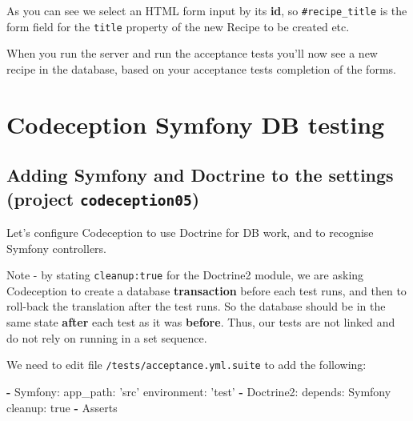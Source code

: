 \documentclass[a4paperpaper,openright]{book}
\newenvironment{Shaded}{}{}
\newcommand{\AttributeTok}[1]{\textcolor[rgb]{0.49,0.56,0.16}{#1}}
\newcommand{\CharTok}[1]{\textcolor[rgb]{0.25,0.44,0.63}{#1}}
\newcommand{\FunctionTok}[1]{\textcolor[rgb]{0.02,0.16,0.49}{#1}}
\newcommand{\KeywordTok}[1]{\textcolor[rgb]{0.00,0.44,0.13}{\textbf{#1}}}
\newcommand{\NormalTok}[1]{#1}
\newcommand{\StringTok}[1]{\textcolor[rgb]{0.25,0.44,0.63}{#1}}
\begin{document}
As you can see we select an HTML form input by its \textbf{id}, so
\texttt{\#recipe\_title} is the form field for the \texttt{title}
property of the new Recipe to be created etc.

When you run the server and run the acceptance tests you'll now see a
new recipe in the database, based on your acceptance tests completion of
the forms.

\hypertarget{codeception-symfony-db-testing}{%
\chapter{Codeception Symfony DB
testing}\label{codeception-symfony-db-testing}}

\hypertarget{adding-symfony-and-doctrine-to-the-settings-project-codeception05}{%
\section{\texorpdfstring{Adding Symfony and Doctrine to the settings
(project
\texttt{codeception05})}{Adding Symfony and Doctrine to the settings (project codeception05)}}\label{adding-symfony-and-doctrine-to-the-settings-project-codeception05}}

Let's configure Codeception to use Doctrine for DB work, and to
recognise Symfony controllers.

Note - by stating \texttt{cleanup:true} for the Doctrine2 module, we are
asking Codeception to create a database \textbf{transaction} before each
test runs, and then to roll-back the translation after the test runs. So
the database should be in the same state \textbf{after} each test as it
was \textbf{before}. Thus, our tests are not linked and do not rely on
running in a set sequence.

We need to edit file \texttt{/tests/acceptance.yml.suite} to add the
following:

\begin{Shaded}
\begin{Highlighting}[]
    \KeywordTok{-} \FunctionTok{Symfony:}
        \FunctionTok{app_path:}\AttributeTok{ }\StringTok{'src'}
        \FunctionTok{environment:}\AttributeTok{ }\StringTok{'test'}
    \KeywordTok{-} \FunctionTok{Doctrine2:}
        \FunctionTok{depends:}\AttributeTok{ Symfony}
        \FunctionTok{cleanup:}\AttributeTok{ }\CharTok{true}
    \KeywordTok{-}\NormalTok{ Asserts}
\end{Highlighting}
\end{Shaded}
\end{document}
